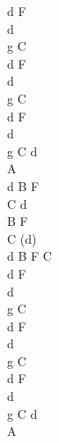 \documentclass[a5paper, 10pt]{book}
\begin{document}
\begin{minipage}[t]{0.2\textwidth}
 d F\\
 d\\
 g C\\
  d F\\
 d\\
 g C\\
  d F\\
 d\\
 g C  d\\
 A\\

d B F\\
C d\\
 B F\\
 C (d)\\
d B F C\\

 d F\\
 d\\
 g C\\
  d F\\
 d\\
 g C\\
  d F\\
 d\\
 g C  d\\
 A\\
\end{minipage}

\newpage
\end{document}
